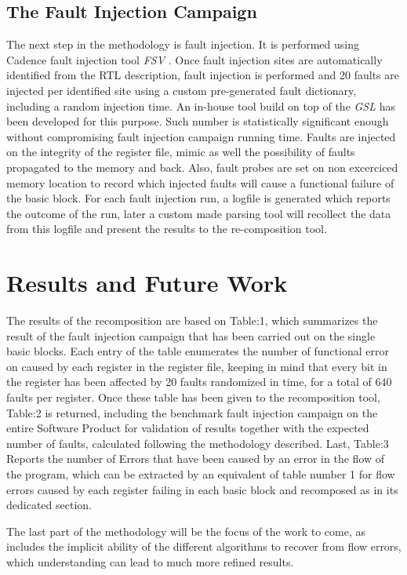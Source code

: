 \documentclass[./dissertation.tex]{subfiles}
\begin{document}
\subsection{The Fault Injection Campaign}
The next step in the methodology is fault injection. It is performed using Cadence fault injection tool {\it FSV} \cite{ICM}. Once fault injection sites are automatically identified from the RTL description, fault injection is performed and 20 faults are injected per identified site using a custom pre-generated fault dictionary, including a random injection time. An in-house tool build on top of the {\it GSL} \cite{GSL} has been developed for this purpose. Such number is statistically significant enough \cite{5090716} without compromising fault injection campaign running time. Faults are injected on the integrity of the register file, mimic as well the possibility of faults propagated to the memory and back. Also, fault probes are set on non excerciced memory location to record which injected faults will cause a functional failure of the basic block. For each fault injection run, a logfile is generated which reports the outcome of the run, later a custom made parsing tool will recollect the data from this logfile and present the results to the re-composition tool.

 


%
%
\section{Results and Future Work}
The results of the recomposition are based on Table:1, which summarizes the result of the fault injection campaign that has been carried out on the single basic blocks. Each entry of the table enumerates the number of functional error on caused by each register in the register file, keeping in mind that every bit in the register has been affected by 20 faults randomized in time, for a total of 640 faults per register. Once these table has been given to the recomposition tool, Table:2 is returned, including the benchmark fault injection campaign on the entire Software Product for validation of results together with the expected number of faults, calculated following the methodology described. Last, Table:3 Reports the number of Errors that have been caused by an error in the flow of the program, which can be extracted by an equivalent of table number 1 for flow errors caused by each register failing in each basic block and recomposed as in its dedicated section.

The last part of the methodology will be the focus of the work to come, as includes the implicit ability of the different algorithms to recover from flow errors, which understanding can lead to much more refined results.
\label{sec:discussion}
\end{document}
